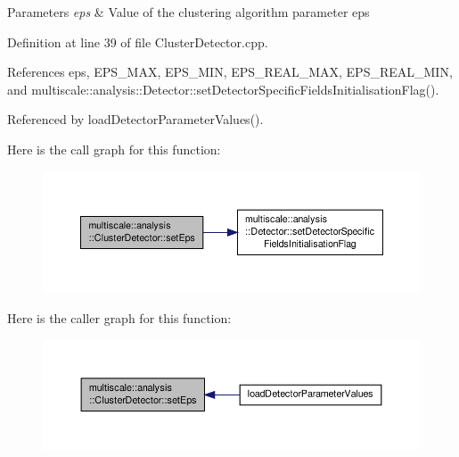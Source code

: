 \begin{DoxyParams}{Parameters}
{\em eps} & Value of the clustering algorithm parameter eps \\
\hline
\end{DoxyParams}


Definition at line 39 of file Cluster\-Detector.\-cpp.



References eps, E\-P\-S\-\_\-\-M\-A\-X, E\-P\-S\-\_\-\-M\-I\-N, E\-P\-S\-\_\-\-R\-E\-A\-L\-\_\-\-M\-A\-X, E\-P\-S\-\_\-\-R\-E\-A\-L\-\_\-\-M\-I\-N, and multiscale\-::analysis\-::\-Detector\-::set\-Detector\-Specific\-Fields\-Initialisation\-Flag().



Referenced by load\-Detector\-Parameter\-Values().



Here is the call graph for this function\-:
\nopagebreak
\begin{figure}[H]
\begin{center}
\leavevmode
\includegraphics[width=350pt]{classmultiscale_1_1analysis_1_1ClusterDetector_a35eaa560c893a86c3149471f40c15979_cgraph}
\end{center}
\end{figure}




Here is the caller graph for this function\-:\nopagebreak
\begin{figure}[H]
\begin{center}
\leavevmode
\includegraphics[width=350pt]{classmultiscale_1_1analysis_1_1ClusterDetector_a35eaa560c893a86c3149471f40c15979_icgraph}
\end{center}
\end{figure}


